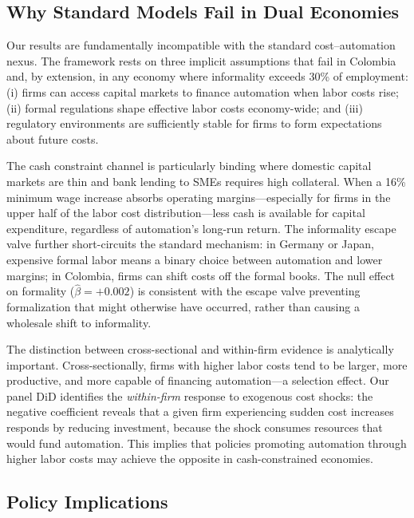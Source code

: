 \documentclass[a4paper,fleqn]{cas-sc}
\begin{document}
\subsection{Why Standard Models Fail in Dual Economies}
\label{subsec:discussion_trap}

Our results are fundamentally incompatible with the standard cost--automation nexus. The \citet{acemoglu2019automation} framework rests on three implicit assumptions that fail in Colombia and, by extension, in any economy where informality exceeds 30\% of employment: (i) firms can access capital markets to finance automation when labor costs rise; (ii) formal regulations shape effective labor costs economy-wide; and (iii) regulatory environments are sufficiently stable for firms to form expectations about future costs.

The cash constraint channel is particularly binding where domestic capital markets are thin and bank lending to SMEs requires high collateral. When a 16\% minimum wage increase absorbs operating margins---especially for firms in the upper half of the labor cost distribution---less cash is available for capital expenditure, regardless of automation's long-run return. The informality escape valve further short-circuits the standard mechanism: in Germany or Japan, expensive formal labor means a binary choice between automation and lower margins; in Colombia, firms can shift costs off the formal books. The null effect on formality ($\hat{\beta} = +0.002$) is consistent with the escape valve preventing formalization that might otherwise have occurred, rather than causing a wholesale shift to informality.

The distinction between cross-sectional and within-firm evidence is analytically important. Cross-sectionally, firms with higher labor costs tend to be larger, more productive, and more capable of financing automation---a selection effect. Our panel DiD identifies the \emph{within-firm} response to exogenous cost shocks: the negative coefficient reveals that a given firm experiencing sudden cost increases responds by reducing investment, because the shock consumes resources that would fund automation. This implies that policies promoting automation through higher labor costs may achieve the opposite in cash-constrained economies.

\subsection{Policy Implications}
\label{subsec:policy_impl}
\end{document}
